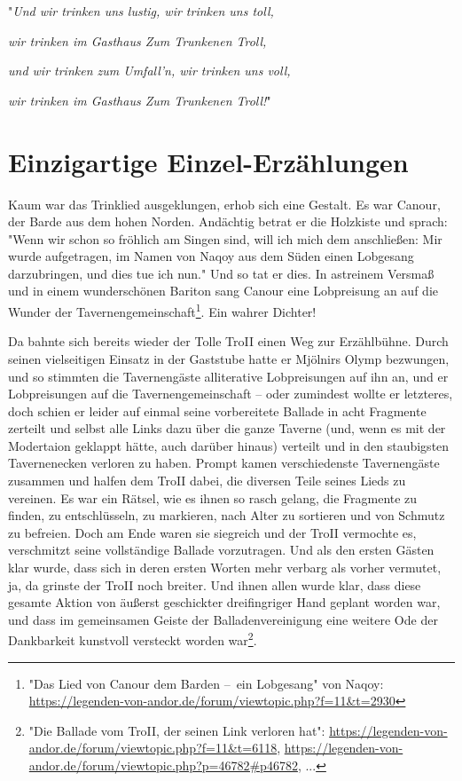 "\textit{Und wir trinken uns lustig, wir trinken uns toll,}

\textit{wir trinken im Gasthaus Zum Trunkenen Troll,}

\textit{und wir trinken zum Umfall'n, wir trinken uns voll,}

\textit{wir trinken im Gasthaus Zum Trunkenen Troll!}"





\section{Einzigartige Einzel-Erzählungen}




Kaum war das Trinklied ausgeklungen, erhob sich eine Gestalt. Es war Canour, der Barde aus dem hohen Norden. Andächtig betrat er die Holzkiste und sprach: "Wenn wir schon so fröhlich am Singen sind, will ich mich dem anschließen: Mir wurde aufgetragen, im Namen von Naqoy aus dem Süden einen Lobgesang darzubringen, und dies tue ich nun." Und so tat er dies. In astreinem Versmaß und in einem wunderschönen Bariton sang Canour eine Lobpreisung an auf die Wunder der Tavernengemeinschaft\footnote{"Das Lied von Canour dem Barden – ein Lobgesang" von Naqoy: \url{https://legenden-von-andor.de/forum/viewtopic.php?f=11&t=2930}}. Ein wahrer Dichter!

Da bahnte sich bereits wieder der Tolle TroII einen Weg zur Erzählbühne. Durch seinen vielseitigen Einsatz in der Gaststube hatte er Mjölnirs Olymp bezwungen, und so stimmten die Tavernengäste alliterative Lobpreisungen auf ihn an, und er Lobpreisungen auf die Tavernengemeinschaft – oder zumindest wollte er letzteres, doch schien er leider auf einmal seine vorbereitete Ballade in acht Fragmente zerteilt und selbst alle Links dazu über die ganze Taverne (und, wenn es mit der Modertaion geklappt hätte, auch darüber hinaus) verteilt und in den staubigsten Tavernenecken verloren zu haben. Prompt kamen verschiedenste Tavernengäste zusammen und halfen dem TroII dabei, die diversen Teile seines Lieds zu vereinen. Es war ein Rätsel, wie es ihnen so rasch gelang, die Fragmente zu finden, zu entschlüsseln, zu markieren, nach Alter zu sortieren und von Schmutz zu befreien. Doch am Ende waren sie siegreich und der TroII vermochte es, verschmitzt seine vollständige Ballade vorzutragen. Und als den ersten Gästen klar wurde, dass sich in deren ersten Worten mehr verbarg als vorher vermutet, ja, da grinste der TroII noch breiter. Und ihnen allen wurde klar, dass diese gesamte Aktion von äußerst geschickter dreifingriger Hand geplant worden war, und dass im gemeinsamen Geiste der Balladenvereinigung eine weitere Ode der Dankbarkeit kunstvoll versteckt worden war\footnote{"Die Ballade vom TroII, der seinen Link verloren hat": \url{https://legenden-von-andor.de/forum/viewtopic.php?f=11&t=6118}, \url{https://legenden-von-andor.de/forum/viewtopic.php?p=46782\#p46782}, ...}.

